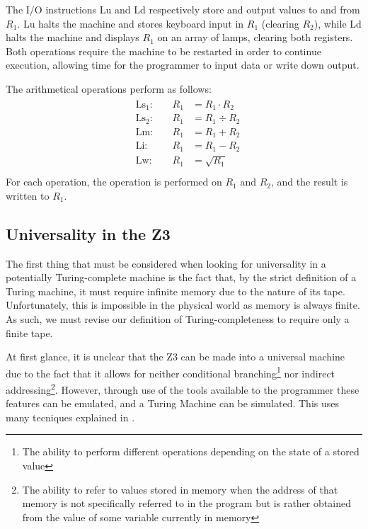 \documentclass[Master.tex]{subfiles}
\begin{document}
The I/O instructions Lu and Ld respectively store and output values to and from $R_1$. Lu halts the machine and stores keyboard input in $R_1$ (clearing $R_2$), while Ld halts the machine and displays $R_1$ on an array of lamps, clearing both registers. Both operations require the machine to be restarted in order to continue execution, allowing time for the programmer to input data or write down output.

The arithmetical operations perform as follows:
\begin{gather*}
\begin{aligned}
&\mathrm{Ls_1}:\quad	&R_1 &= R_1 \cdot R_2 \\
&\mathrm{Ls_2}:\quad	&R_1 &= R_1 \div R_2 \\
&\mathrm{Lm}:\quad	&R_1 &= R_1 + R_2 \\
&\mathrm{Li}:\quad	&R_1 &= R_1 - R_2 \\
&\mathrm{Lw}:\quad	&R_1 &= \sqrt{R_1} \\
\end{aligned}
\end{gather*}
For each operation, the operation is performed on $R_1$ and $R_2$, and the result is written to $R_1$. 
\subsection{Universality in the Z3}

The first thing that must be considered when looking for universality in a potentially Turing-complete machine is the fact that, by the strict definition of a Turing machine, it must require infinite memory due to the nature of its tape. Unfortunately, this is impossible in the physical world as memory is always finite. As such, we must revise our definition of Turing-completeness to require only a finite tape.

At first glance, it is unclear that the Z3 can be made into a universal machine due to the fact that it allows for neither conditional branching\footnote{The ability to perform different operations depending on the state of a stored value} nor indirect addressing\footnote{The ability to refer to values stored in memory when the address of that memory is not specifically referred to in the program but is rather obtained from the value of some variable currently in memory}. However, through use of the tools available to the programmer these features can be emulated, and a Turing Machine can be simulated. This uses many tecniques explained in \cite{rojas1998z3universal}.
\end{document}
